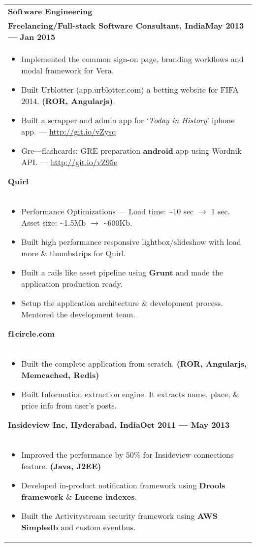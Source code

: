 \documentclass{article}
\begin{document}
\begin{tabular}{p{\dimexpr\linewidth-2\tabcolsep}}
    \bigskip
    \bfseries \large{Software Engineering}\\
    \smallskip
    {\bfseries Freelancing/Full-stack Software Consultant, India\hfill May 2013 --- Jan 2015} \\
    \begin{itemize}
        \item Implemented the common sign-on page, branding workflows and modal framework for Vera.
        \item Built Urblotter (app.urblotter.com) a betting website for FIFA 2014. \textbf{(ROR, Angularjs)}.
        \item Built a scrapper and admin app for `\textit{Today in History}' iphone app. --- \url{http://git.io/vZysq}
        \item Gre---flashcards: GRE preparation \textbf{android} app using Wordnik API\@. --- \url{http://git.io/vZ95e}
    \end{itemize}
    \bigskip
    \bfseries \enskip{} Quirl \\
    \begin{itemize}
        \item Performance Optimizations --- Load time: \textasciitilde10 sec \( \rightarrow \) 1 sec. Asset size: \textasciitilde1.5Mb \( \rightarrow \) \textasciitilde600Kb.
        \item Built high performance responsive lightbox/slideshow with load more \& thumbstrips for Quirl.
        \item Built a rails like asset pipeline using \textbf{Grunt} and made the application production ready.
        \item Setup the application architecture \& development process. Mentored the development team.
    \end{itemize}
    \bigskip
    \bfseries \enskip{} f1circle.com \\
    \begin{itemize}
        \item Built the complete application from scratch. \textbf{(ROR, Angularjs, Memcached, Redis)}
        \item Built Information extraction engine. It extracts name, place, \& price info from user's posts.
    \end{itemize}

    \bigskip
    {\bfseries Insideview Inc, Hyderabad, India\hfill Oct 2011 --- May 2013} \\
    \begin{itemize}
      \item Improved the performance by 50\% for Insideview connections feature. \textbf{(Java, J2EE)}
      \item Developed in-product notification framework using \textbf{Drools framework} \& \textbf{Lucene indexes}.
      \item Built the Activitystream security framework using \textbf{AWS Simpledb} and custom eventbus.
    \end{itemize}


\end{tabular}
\end{document}
